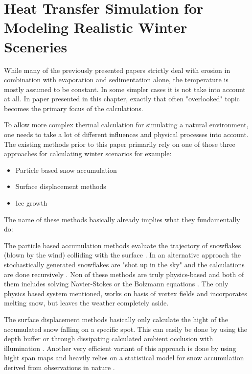 \section{Heat Transfer Simulation for Modeling Realistic Winter Sceneries}

While many of the previously presented papers strictly deal with erosion in combination with evaporation and sedimentation alone, the temperature is mostly assumed to be constant. In some simpler cases it is not take into account at all. In paper presented in this chapter, exactly that often "overlooked" topic becomes the primary focus of the calculations.

To allow more complex thermal calculation for simulating a natural environment, one needs to take a lot of different influences and physical processes into account. The existing methods prior to this paper primarily rely on one of those three approaches for calculating winter scenarios for example:
\begin{itemize}
	\item Particle based snow accumulation
	\item Surface displacement methods
	\item Ice growth
\end{itemize}

The name of these methods basically already implies what they fundamentally do:

The particle based accumulation methods evaluate the trajectory of snowflakes (blown by the wind) colliding with the surface \cite{nishita1997modeling}. In an alternative approach the stochastically generated snowflakes are "shot up in the sky" and the calculations are done recursively \cite{fearing2000computer}. Non of these methods are truly physics-based and both of them includes solving Navier-Stokes \cite{feldman2002modeling} or the Bolzmann equations \cite{wang2006real}. The only physics based system mentioned, works on basis of vortex fields and incorporates melting snow, but leaves the weather completely aside.

The surface displacement methods basically only calculate the hight of the accumulated snow falling on a specific spot. This can easily be done by using the depth buffer \cite{ohlsson2004real} or through dissipating calculated ambient occlusion with illumination \cite{foldes2007occlusion}. Another very efficient variant of this approach is done by using hight span maps and heavily relies on a statistical model for snow accumulation derived from observations in nature \cite{haglund2002snow} \cite{festenberg2009geometric}.

